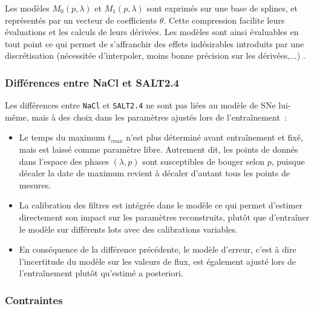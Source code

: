 \documentclass{book}
\def\nacl{\texttt{NaCl}\xspace}
\def\saltd{\texttt{SALT2.4}\xspace}
\begin{document}
Les modèles $M_0(p, \lambda)$ et $M_1(p, \lambda)$ sont exprimés sur une base de splines, et représentés par un vecteur de coefficients $\theta$. Cette compression facilite leurs évaluations et les calculs de leurs dérivées. Les modèles sont ainsi évaluables en tout point ce qui permet de s'affranchir des effets indésirables introduits par une discrétisation (nécessitée d'interpoler, moins bonne précision sur les dérivées,...) .

\subsubsection{Différences entre NaCl et SALT2.4}

Les différences entre \nacl et \saltd ne sont pas liées au modèle de SNe lui-même, mais à des choix dans les paramètres ajustés lors de l'entraînement~:
\begin{itemize}
\item Le temps du maximum $t_{max}$ n'est plus déterminé avant entraînement et fixé, mais est laissé comme paramètre libre. Autrement dit, les points de donnés dans l'espace des phases $(\lambda, p)$ sont susceptibles de bouger selon $p$, puisque décaler la date de maximum revient à décaler d'autant tous les points de mesures.
\item La calibration des filtres est intégrée dans le modèle ce qui permet d'estimer directement son impact sur les paramètres reconstruits, plutôt que d'entraîner le modèle sur différents lots avec des calibrations variables.
\item En conséquence de la différence précédente, le modèle d'erreur, c'est à dire l'incertitude du modèle sur les valeurs de flux, est également ajusté lors de l'entraînement plutôt qu'estimé a posteriori.
\end{itemize}

\subsubsection{Contraintes}
\end{document}
